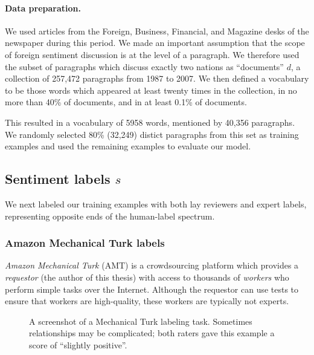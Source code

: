 \paragraph{Data preparation.}
We used articles from the Foreign, Business, Financial, and Magazine
desks of the newspaper during this period. We made an important
assumption that the scope of foreign sentiment discussion is at the
level of a paragraph.  We therefore used the subset of paragraphs
which discuss exactly two nations as ``documents'' $d$, a collection
of 257,472 paragraphs from 1987 to 2007.  We then defined a vocabulary
to be those words which appeared at least twenty times in the
collection, in no more than 40\% of documents, and in at least 0.1\%
of documents.

This resulted in a vocabulary of 5958 words, mentioned by 40,356
paragraphs. We randomly selected 80\% (32,249) distict paragraphs from
this set as training examples and used the remaining examples to
evaluate our model.

\subsection{Sentiment labels $s$}
\label{section:sentiment_models}

We next labeled our training examples with both lay reviewers and
expert labels, representing opposite ends of the human-label spectrum.

\subsubsection{Amazon Mechanical Turk labels}
\label{section:mturk}

\emph{Amazon Mechanical Turk} (AMT) is a crowdsourcing platform which
provides a \emph{requestor} (the author of this thesis) with access to
thousands of \emph{workers} who perform simple tasks over the
Internet.  Although the requestor can use tests to ensure that workers
are high-quality, these workers are typically not experts.

\begin{figure}
  \setlength\fboxsep{0pt}
  \setlength\fboxrule{0.5pt}
  \center {}
  \label{fig:mechanical_turk_sample}
  \small\caption{A screenshot of a Mechanical Turk labeling task.
    Sometimes relationships may be complicated; both raters gave this
    example a score of ``slightly positive''.}
  \normalsize
\end{figure}

